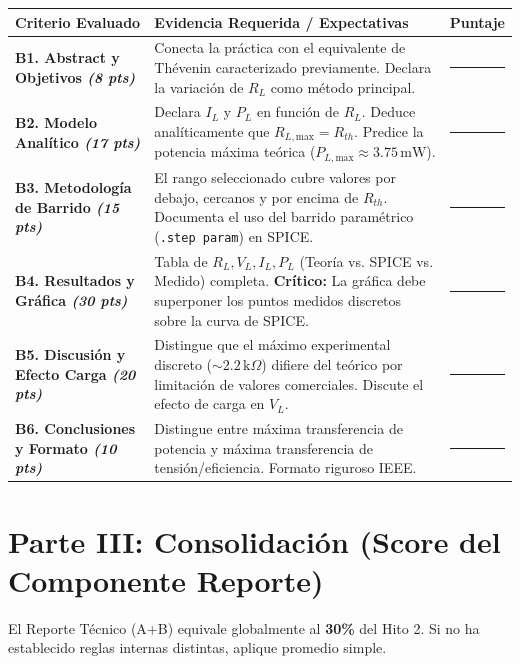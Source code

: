 \documentclass[11pt, a4paper]{article}
\begin{document}
\vspace{0.3cm}
\renewcommand{\arraystretch}{1.5}
\noindent
\begin{tabularx}{\textwidth}{>{\bfseries\RaggedRight}p{4cm} >{\RaggedRight\arraybackslash}X >{\centering\arraybackslash}p{1.5cm}}
\toprule
\textbf{Criterio Evaluado} & \textbf{Evidencia Requerida / Expectativas} & \textbf{Puntaje} \\ 
\midrule
B1. Abstract y Objetivos \newline \textit{(8 pts)} & Conecta la práctica con el equivalente de Thévenin caracterizado previamente. Declara la variación de $R_L$ como método principal. & \rule{1cm}{0.4pt} \\ \addlinespace
B2. Modelo Analítico \newline \textit{(17 pts)} & Declara $I_L$ y $P_L$ en función de $R_L$. Deduce analíticamente que $R_{L,\text{max}} = R_{th}$. Predice la potencia máxima teórica ($P_{L,\text{max}} \approx 3.75\,\text{mW}$). & \rule{1cm}{0.4pt} \\ \addlinespace
B3. Metodología de Barrido \newline \textit{(15 pts)} & El rango seleccionado cubre valores por debajo, cercanos y por encima de $R_{th}$. Documenta el uso del barrido paramétrico (\texttt{.step param}) en SPICE. & \rule{1cm}{0.4pt} \\ \addlinespace
B4. Resultados y Gráfica \newline \textit{(30 pts)} & Tabla de $R_L, V_L, I_L, P_L$ (Teoría vs. SPICE vs. Medido) completa. \textbf{Crítico:} La gráfica debe superponer los puntos medidos discretos sobre la curva de SPICE. & \rule{1cm}{0.4pt} \\ \addlinespace
B5. Discusión y Efecto Carga \newline \textit{(20 pts)} & Distingue que el máximo experimental discreto ($\sim 2.2\,\text{k}\Omega$) difiere del teórico por limitación de valores comerciales. Discute el efecto de carga en $V_L$. & \rule{1cm}{0.4pt} \\ \addlinespace
B6. Conclusiones y Formato \newline \textit{(10 pts)} & Distingue entre máxima transferencia de potencia y máxima transferencia de tensión/eficiencia. Formato riguroso IEEE. & \rule{1cm}{0.4pt} \\ 
\bottomrule
\end{tabularx}

\vspace{0.8cm}
\section*{Parte III: Consolidación (Score del Componente Reporte)}
El Reporte Técnico (A+B) equivale globalmente al \textbf{30\%} del Hito 2. Si no ha establecido reglas internas distintas, aplique promedio simple.
\end{document}
